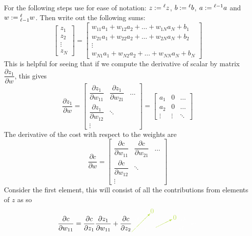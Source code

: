 \documentclass[11pt]{report} %
\begin{document}
For the following steps use for ease of notation: $z:=\mathstrut^{\ell}z$, $b:=\mathstrut^{\ell}b$,  $a:=\mathstrut^{\ell-1}a$ and $w:=\mathstrut_{\ell-1}^{\ell}w$. Then write out the following sums:
\begin{equation}
\begin{bmatrix}z_{1}\\
z_{2}\\
\vdots\\
z_{N}
\end{bmatrix}=\begin{bmatrix}w_{11}a_{1}+w_{12}a_{2}+\dots+w_{1N}a_{N}+b_{1}\\
w_{21}a_{1}+w_{22}a_{2}+\dots+w_{2N}a_{N}+b_{2}\\
\vdots\\
w_{N1}a_{1}+w_{N2}a_{2}+\dots+w_{NN}a_{N}+b_{N}
\end{bmatrix}
\end{equation}
This is helpful for seeing that if we compute the derivative of scalar by matrix $\dfrac{\partial z_{1}}{\partial w}$, this gives
\begin{equation}
\dfrac{\partial z_{1}}{\partial w}=\begin{bmatrix}\dfrac{\partial z_{1}}{\partial w_{11}} & \dfrac{\partial z_{1}}{\partial w_{21}} & \dots\\
\dfrac{\partial z_{1}}{\partial w_{12}} & \ddots\\
\vdots
\end{bmatrix}=\begin{bmatrix}a_{1} & 0 & \dots\\
a_{2} & 0 & \dots\\
\vdots & \vdots & \ddots
\end{bmatrix}
\end{equation}
The derivative of the cost with respect to the weights are
\begin{equation}
\dfrac{\partial c}{\partial w}=\begin{bmatrix}\dfrac{\partial c}{\partial w_{11}} & \dfrac{\partial c}{\partial w_{21}} & \dots\\
\dfrac{\partial c}{\partial w_{12}} & \ddots\\
\vdots
\end{bmatrix}
\end{equation}
Consider the first element, this will consist of all the contributions from elements of $z$ as so
\begin{equation}
\dfrac{\partial c}{\partial w_{11}}=\dfrac{\partial c}{\partial z_{1}}\dfrac{\partial z_{1}}{\partial w_{11}}+\dfrac{\partial c}{\partial z_{2}}\green\cancelto{0}{\black\dfrac{\partial z_{2}}{\partial w_{11}}}\black+\green\cancelto{0}{\black\left[\dots\right]}\black=\dfrac{\partial c}{\partial z_{1}}a_{1}
\end{equation}
\end{document}
